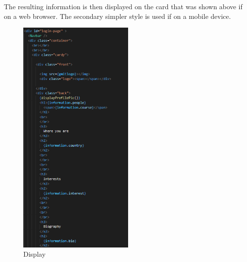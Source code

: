 The resulting information is then displayed on the card that was shown above if on a web browser. The secondary simpler style is used if on a mobile device. \\
\begin{figure}[H]
    \centering
    \includegraphics[height=12cm]{img/home 6.png}
    \caption{Display} 
    \label{fig:my_label}
\end{figure}



